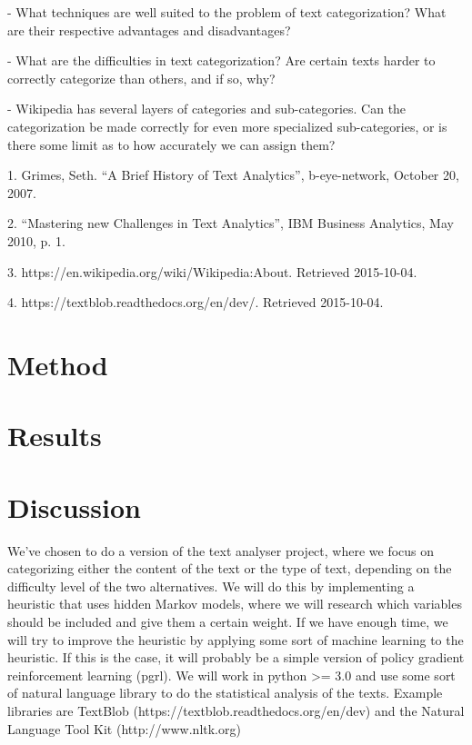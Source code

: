 \documentclass[a4paper]{article}
\begin{document}
\vspace{3mm}

- What techniques are well suited to the problem of text categorization? What are their respective advantages and disadvantages?

\vspace{3mm}

- What are the difficulties in text categorization? Are certain texts harder to correctly categorize than others, and if so, why?

\vspace{3mm}

- Wikipedia has several layers of categories and sub-categories. Can the categorization be made correctly for even more specialized sub-categories, or is there some limit as to how accurately we can assign them?


\vspace{3mm}

1. Grimes, Seth. “A Brief History of Text Analytics”, b-eye-network, October 20, 2007.

2. “Mastering new Challenges in Text Analytics”, IBM Business Analytics, May 2010, p. 1.

3. https://en.wikipedia.org/wiki/Wikipedia:About. Retrieved 2015-10-04.

4. https://textblob.readthedocs.org/en/dev/. Retrieved 2015-10-04.

\section*{Method}  

\section*{Results}

\section*{Discussion}


We've chosen to do a version of the text analyser project, where we focus on categorizing either the content of the text or the type of text, depending on the difficulty level of the two alternatives. We will do this by implementing a heuristic that uses hidden Markov models, where we will research which variables should be included and give them a certain weight. If we have enough time, we will try to improve the heuristic by applying some sort of machine learning to the heuristic. If this is the case, it will probably be a simple version of policy gradient reinforcement learning (pgrl). We will work in python \textgreater= 3.0 and use some sort of natural language library to do the statistical analysis of the texts. Example libraries are TextBlob (https://textblob.readthedocs.org/en/dev) and the Natural Language Tool Kit (http://www.nltk.org)
\newline
\end{document}
